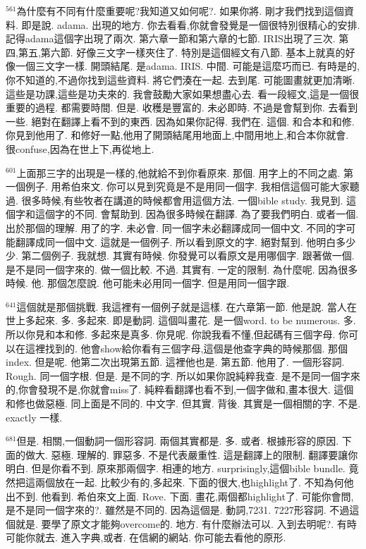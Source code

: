 \documentclass{book}
\begin{document}
$^{561}$為什麼有不同有什麼重要呢?我知道又如何呢?.
如果你將.
剛才我們找到這個資料.
即是說.
adama.
出現的地方.
你去看看,你就會發覺是一個很特別很精心的安排.
記得adama這個字出現了兩次.
第六章一節和第六章的七節.
IRIS出現了三次.
第四,第五,第六節.
好像三文字一樣夾住了.
特別是這個經文有八節.
基本上就真的好像一個三文字一樣.
開頭結尾.
是adama.
IRIS.
中間.
可能是這麼巧而已.
有時是的,你不知道的,不過你找到這些資料.
將它們湊在一起.
去到尾.
可能圖畫就更加清晰.
這些是功課,這些是功夫來的.
我會鼓勵大家如果想盡心去.
看一段經文,這是一個很重要的過程.
都需要時間.
但是.
收穫是豐富的.
未必即時.
不過是會幫到你.
去看到一些.
絕對在翻譯上看不到的東西.
因為如果你記得.
我們在.
這個.
和合本和和修.
你見到他用了.
和修好一點,他用了開頭結尾用地面上,中間用地上,和合本你就會.
很confuse,因為在世上下,再從地上.

$^{601}$上面那三字的出現是一樣的,他就給不到你看原來.
那個.
用字上的不同之處.
第一個例子.
用希伯來文.
你可以見到究竟是不是用同一個字.
我相信這個可能大家聽過.
很多時候,有些牧者在講道的時候都會用這個方法.
一個bible study.
我見到.
這個字和這個字的不同.
會幫助到.
因為很多時候在翻譯.
為了要我們明白.
或者一個.
出於那個的理解.
用了的字.
未必會.
同一個字未必翻譯成同一個中文.
不同的字可能翻譯成同一個中文.
這就是一個例子.
所以看到原文的字.
絕對幫到.
他明白多少少.
第二個例子.
我就想.
其實有時候.
你發覺可以看原文是用哪個字.
跟著做一個.
是不是同一個字來的.
做一個比較.
不過.
其實有.
一定的限制.
為什麼呢.
因為很多時候.
他.
那個怎麼說.
他可能未必用同一個字.
但是用同一個字跟.

$^{641}$這個就是那個挑戰.
我這裡有一個例子就是這樣.
在六章第一節.
他是說.
當人在世上多起來.
多.
多起來.
即是動詞.
這個叫畫花.
是一個word.
to be numerous.
多.
所以你見和本和修.
多起來是真多.
你見呢.
你說我看不懂,但起碼有三個字母.
你可以在這裡找到的.
他會show給你看有三個字母,這個是他查字典的時候那個.
那個index.
但是呢.
他第二次出現第五節.
這裡他也是.
第五節.
他用了.
一個形容詞.
Rough.
同一個字根.
但是.
是不同的字.
所以如果你說純粹我查.
是不是同一個字來的,你會發現不是,你就會miss了.
純粹看翻譯也看不到,一個字做和,畫本很大.
這個和修也做惡極.
同上面是不同的.
中文字.
但其實.
背後.
其實是一個相關的字.
不是.
exactly 一樣.

$^{681}$但是.
相關,一個動詞一個形容詞.
兩個其實都是.
多.
或者.
根據形容的原因.
下面的做大.
惡極.
理解的.
罪惡多.
不是代表嚴重性.
這是翻譯上的限制.
翻譯要讓你明白.
但是你看不到.
原來那兩個字.
相連的地方.
surprisingly,這個bible bundle.
竟然把這兩個放在一起.
比較少有的,多起來.
下面的很大,也highlight了.
不知為何他出不到.
他看到.
希伯來文上面.
Rove.
下面.
畫花,兩個都highlight了.
可能你會問,是不是同一個字來的?.
雖然是不同的.
因為這個是.
動詞,7231.
7227形容詞.
不過這個就是.
要學了原文才能夠overcome的.
地方.
有什麼辦法可以.
入到去明呢?.
有時可能你就去.
進入字典,或者.
在信網的網站.
你可能去看他的原形.
\end{document}
